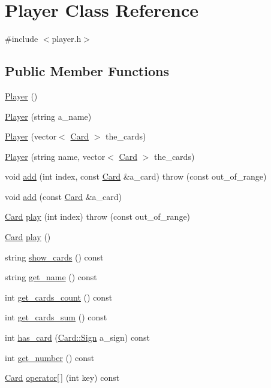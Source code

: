 \hypertarget{classPlayer}{\section{Player Class Reference}
\label{classPlayer}
}


{\ttfamily \#include $<$player.\-h$>$}

\subsection*{Public Member Functions}
\begin{DoxyCompactItemize}
\item 
\hyperlink{classPlayer_affe0cc3cb714f6deb4e62f0c0d3f1fd8}{Player} ()
\item 
\hyperlink{classPlayer_a9d3c9595e25f0c4e450e3c1ad05f019f}{Player} (string a\-\_\-name)
\item 
\hyperlink{classPlayer_acf4d65db8287cba003403eb8d097a734}{Player} (vector$<$ \hyperlink{classCard}{Card} $>$ the\-\_\-cards)
\item 
\hyperlink{classPlayer_a48ebeacce711bf78b731801610c1fc69}{Player} (string name, vector$<$ \hyperlink{classCard}{Card} $>$ the\-\_\-cards)
\item 
void \hyperlink{classPlayer_ac11f4cd974b2e7713ad8a143b1586a24}{add} (int index, const \hyperlink{classCard}{Card} \&a\-\_\-card)  throw (const out\-\_\-of\-\_\-range)
\item 
void \hyperlink{classPlayer_aec254ed0de6e40e8a80971b2b0500d69}{add} (const \hyperlink{classCard}{Card} \&a\-\_\-card)
\item 
\hyperlink{classCard}{Card} \hyperlink{classPlayer_a903efc2bf0e6c8d43747c5e3818d8bb6}{play} (int index)  throw (const out\-\_\-of\-\_\-range)
\item 
\hyperlink{classCard}{Card} \hyperlink{classPlayer_a12de728d5de9a6f83df931cecb9fb7ef}{play} ()
\item 
string \hyperlink{classPlayer_aa72f56f8af4ecbea1062a7b3121d3f98}{show\-\_\-cards} () const 
\item 
string \hyperlink{classPlayer_af45fe3702ac2ceb4bdb1bf144d472dc1}{get\-\_\-name} () const 
\item 
int \hyperlink{classPlayer_ad12c601751ab46fa79a0ba0eec8e5c76}{get\-\_\-cards\-\_\-count} () const 
\item 
int \hyperlink{classPlayer_ae0879ec5245e9316d17fb91c9bd460f2}{get\-\_\-cards\-\_\-sum} () const 
\item 
int \hyperlink{classPlayer_a1d6095aa82fff649d09b43bdc41ebdfb}{has\-\_\-card} (\hyperlink{classCard_a1e4976f4ceae49d4ed0bdd15ee9d967a}{Card\-::\-Sign} a\-\_\-sign) const 
\item 
int \hyperlink{classPlayer_ae9eb49e547c4c1b8c189955503e8dd3b}{get\-\_\-number} () const 
\item 
\hyperlink{classCard}{Card} \hyperlink{classPlayer_a8b85dba6de4fcdaeca0daf2104e0a7ea}{operator\mbox{[}$\,$\mbox{]}} (int key) const 
\end{DoxyCompactItemize}


